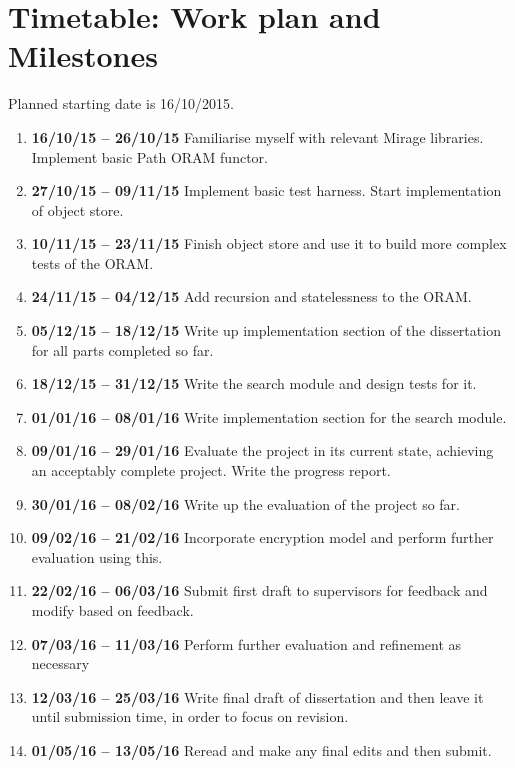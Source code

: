 \documentclass[12pt,a4paper,twoside]{article}
\begin{document}
\section*{Timetable: Work plan and Milestones}

Planned starting date is 16/10/2015.

\begin{enumerate}

\item {\bf 16/10/15 -- 26/10/15} Familiarise myself with relevant Mirage libraries. Implement basic Path ORAM functor.

\item {\bf 27/10/15 -- 09/11/15} Implement basic test harness. Start implementation of object store.

\item {\bf 10/11/15 -- 23/11/15} Finish object store and use it to build more complex tests of the ORAM.

\item {\bf 24/11/15 -- 04/12/15} Add recursion and statelessness to the ORAM.

\item {\bf 05/12/15 -- 18/12/15} Write up implementation section of the dissertation for all parts completed so far.

\item {\bf 18/12/15 -- 31/12/15} Write the search module and design tests for it.

\item {\bf 01/01/16 -- 08/01/16} Write implementation section for the search module.

\item {\bf 09/01/16 -- 29/01/16} Evaluate the project in its current state, achieving an acceptably complete project. Write the progress report.

\item {\bf 30/01/16 -- 08/02/16} Write up the evaluation of the project so far.

\item {\bf 09/02/16 -- 21/02/16} Incorporate encryption model and perform further evaluation using this.

\item {\bf 22/02/16 -- 06/03/16} Submit first draft to supervisors for feedback and modify based on feedback.

\item {\bf 07/03/16 -- 11/03/16} Perform further evaluation and refinement as necessary

\item {\bf 12/03/16 -- 25/03/16} Write final draft of dissertation and then leave it until submission time, in order to focus on revision.

\item {\bf 01/05/16 -- 13/05/16} Reread and make any final edits and then submit.

\end{enumerate}
\end{document}
